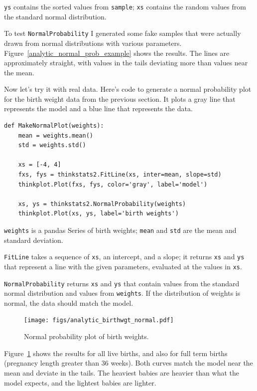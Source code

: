\documentclass[12pt]{book}
\theoremstyle{exercise}
\begin{document}
{\tt ys} contains the sorted values from {\tt sample}; {\tt xs}
contains the random values from the standard normal distribution.

To test {\tt NormalProbability} I generated some fake samples that
were actually drawn from normal distributions with various parameters.
Figure~\ref{analytic_normal_prob_example} shows the results.
The lines are approximately straight, with values in the tails
deviating more than values near the mean.

Now let's try it with real data.  Here's code to generate
a normal probability plot for the birth weight data from the
previous section.  It plots a gray line that represents the model
and a blue line that represents the data.%
%

\begin{verbatim}
def MakeNormalPlot(weights):
    mean = weights.mean()
    std = weights.std()

    xs = [-4, 4]
    fxs, fys = thinkstats2.FitLine(xs, inter=mean, slope=std)
    thinkplot.Plot(fxs, fys, color='gray', label='model')

    xs, ys = thinkstats2.NormalProbability(weights)
    thinkplot.Plot(xs, ys, label='birth weights')
\end{verbatim}

{\tt weights} is a pandas Series of birth weights;
{\tt mean} and {\tt std} are the mean and standard deviation.%
%
%
%

{\tt FitLine} takes a sequence of {\tt xs}, an intercept, and a
slope; it returns {\tt xs} and {\tt ys} that represent a line
with the given parameters, evaluated at the values in {\tt xs}.

{\tt NormalProbability} returns {\tt xs} and {\tt ys} that
contain values from the standard normal distribution and values
from {\tt weights}.  If the distribution of weights is normal,
the data should match the model.%

\begin{figure}
\centerline{\texttt{[image: figs/analytic\_birthwgt\_normal.pdf]}}
\caption{Normal probability plot of birth weights.}%
\label{analytic_birthwgt_normal}
\end{figure}

Figure~\ref{analytic_birthwgt_normal} shows the results for
all live births, and also for full term births (pregnancy length greater
than 36 weeks).  Both curves match the model near the mean and
deviate in the tails.  The heaviest babies are heavier than what
the model expects, and the lightest babies are lighter.%
\end{document}
